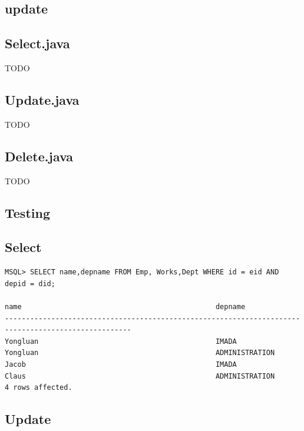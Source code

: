 \documentclass[a4paper,10pt,titlepage]{report}
\begin{document}
\subsection{update}

\subsection{Select.java}

TODO

\subsection{Update.java}

TODO
\subsection{Delete.java}

TODO


\subsection{Testing}

\subsection{Select}
\begin{lstlisting}
MSQL> SELECT name,depname FROM Emp, Works,Dept WHERE id = eid AND depid = did;

name                                              depname                                           
----------------------------------------------------------------------------------------------------
Yongluan                                          IMADA                                             
Yongluan                                          ADMINISTRATION                                    
Jacob                                             IMADA                                             
Claus                                             ADMINISTRATION                                    
4 rows affected.
\end{lstlisting}

\subsection{Update}
\end{document}
